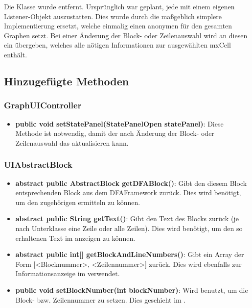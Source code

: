 Die Klasse  wurde entfernt.
Ursprünglich war geplant, jede  mit einem eigenen Listener-Objekt auszustatten.
Dies wurde durch die maßgeblich simplere Implementierung ersetzt, welche einmalig einen anonymen  für den gesamten Graphen setzt.
Bei einer Änderung der Block- oder Zeilenauswahl wird an diesen ein  übergeben, welches alle nötigen Informationen zur ausgewählten mxCell enthält.

\subsection{Hinzugefügte Methoden}

\subsubsection{GraphUIController}
\begin{itemize}
  \item \textbf{public void setStatePanel(StatePanelOpen statePanel)}: Diese Methode ist notwendig, damit der  nach Änderung der Block- oder Zeilenauswahl das  aktualisieren kann.
\end{itemize}

\subsubsection{UIAbstractBlock}
\begin{itemize}
  \item \textbf{abstract public AbstractBlock getDFABlock()}: Gibt den diesem Block entsprechenden Block aus dem DFAFramework zurück. Dies wird benötigt, um den zugehörigen  ermitteln zu können.

  \item \textbf{abstract public String getText()}: Gibt den Text des Blocks zurück (je nach Unterklasse eine Zeile oder alle Zeilen). Dies wird benötigt, um den so erhaltenen Text im  anzeigen zu können.

  \item \textbf{abstract public int[] getBlockAndLineNumbers()}: Gibt ein Array der Form [<Blocknummer>, <Zeilennummer>] zurück. Dies wird ebenfalls zur Informationsanzeige im  verwendet.

  \item \textbf{public void setBlockNumber(int blockNumber)}: Wird benutzt, um die Block- bzw. Zeilennummer zu setzen. Dies geschieht im .
\end{itemize}


